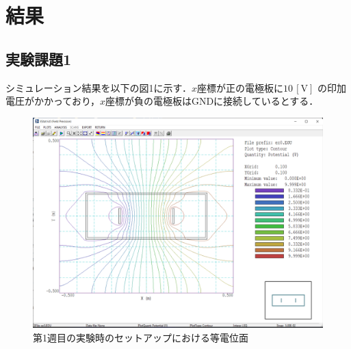 
\section{結果}

\subsection{実験課題1}
シミュレーション結果を以下の図1に示す．$x$座標が正の電極板に$10\,[\si{\volt}]$
の印加電圧がかかっており，$x$座標が負の電極板はGNDに接続しているとする．
\begin{figure}[H]
    \begin{center}
        \includegraphics[scale=0.5]{figure1.pdf}
        \caption{第1週目の実験時のセットアップにおける等電位面}
    \end{center}
\end{figure}
\newpage


